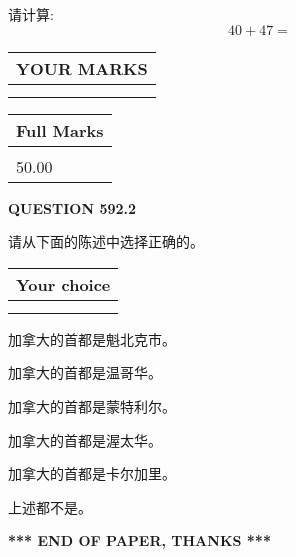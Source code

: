 \documentclass{ctexart}
\begin{document}
  
 
请计算:
\begin{equation}
40 +  %
47 = \nonumber
\end{equation}
 

 

 
  
\vspace{0.2in}
  
\noindent\begin{tabular}{|l|}
\hline
 YOUR MARKS  \\
\hline
 \\ 
 \\ 
\hline
\end{tabular}
\hspace{0.05in} \begin{tabular}{|l|}
\hline
 Full Marks  \\
\hline
 \\ 
50.00 \\
\hline
\end{tabular}
{\textbf{\Large{QUESTION
592.2 
}}}
  
  
请从下面的陈述中选择正确的。
  
  
\noindent\hspace{3.0in} \begin{tabular}{|l|}
\hline
Your choice \\
\hline
 \\ 
 \\ 
\hline
\end{tabular}
  
  
 
 
加拿大的首都是魁北克市。
 
 
加拿大的首都是温哥华。
 
 
加拿大的首都是蒙特利尔。
 
 
加拿大的首都是渥太华。
 
 
加拿大的首都是卡尔加里。
 
 
 上述都不是。
 
 
   
   
 \vspace{0.2in}
 
   
   
   
   
\vspace{1.0in} 
{\textbf{\large{ *** END OF PAPER, THANKS *** }}} 
   
\end{document}

